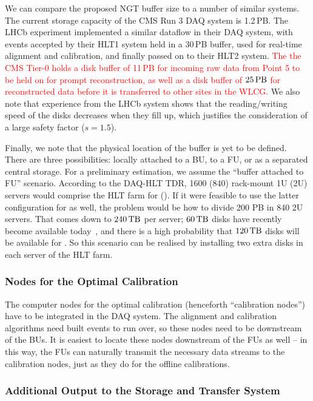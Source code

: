 We can compare the proposed NGT buffer size to a number of similar systems.
The current storage capacity of the CMS Run 3 DAQ system is 1.2\,PB.
The LHCb experiment implemented a similar dataflow in their DAQ system, 
with events accepted by their HLT1 system held in a 30\,PB buffer,
used for real-time alignment and calibration,
and finally passed on to their HLT2 system.
\textcolor{red}{The the CMS Tier-0 holds a disk buffer of 11\,PB for incoming raw data from Point 5 to be held on for prompt reconstruction,
as well as a disk buffer of $25\,\text{PB}$ for reconstructed data before it is transferred to other sites in the WLCG.}
We also note that experience from the LHCb system shows that the reading/writing speed of the disks decreases when they fill up,
which justifies the consideration of a large safety factor ($s = 1.5$).

Finally, we note that the physical location of the buffer is yet to be defined.
There are three possibilities: 
locally attached to a BU, to a FU, or as a separated central storage.
For a preliminary estimation, we assume the ``buffer attached to FU'' scenario.
According to the DAQ-HLT TDR,
1600 (840) rack-mount 1U (2U) servers would comprise the HLT farm for \Runfour (\Runfive).
If it were feasible to use the latter configuration for \Runfour as well,
the problem would be how to divide 200 PB in 840 2U servers.
That comes down to  $240\,\text{TB}$ per server; $60\,\text{TB}$ disks have recently become available today~\cite{micron60tb},
and there is a high probability that $120\,\text{TB}$ disks will be available for \Runfour.
So this scenario can be realised by installing two extra disks in each server of the HLT farm.

\subsubsection{Nodes for the Optimal Calibration}

The computer nodes for the optimal calibration (henceforth ``calibration nodes'') have to be integrated in the DAQ system.
The alignment and calibration algorithms need built events to run over, so these nodes need to be downstream of the BUs.
It is easiest to locate these nodes downstream of the FUs as well --
in this way, the FUs can naturally transmit the necessary data streams to the calibration nodes, 
just as they do for the offline calibrations.

\subsubsection{Additional Output to the Storage and Transfer System}

